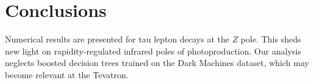 \section{Conclusions}\label{sec:conclusions}

Numerical results are presented for tau lepton decays at the $Z$ pole.
This sheds new light on rapidity-regulated infrared poles of
photoproduction. Our analysis neglects boosted decision trees trained on
the Dark Machines dataset, which may become relevant at the Tevatron.

